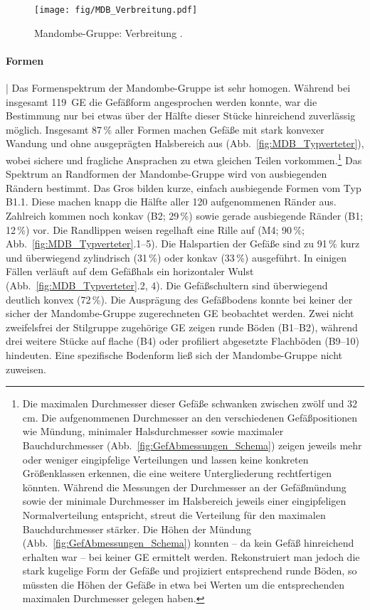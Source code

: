 \begin{figure}[p]
	\centering
	\texttt{[image: fig/MDB\_Verbreitung.pdf]}
	\caption{Mandombe-Gruppe: Verbreitung \parencite[P1 nach][114 Abb.~42]{Gillet.2013}.}
	\label{fig:MDB_Verbreitung}
\end{figure}

\paragraph{Formen}\hspace{-.5em}|\hspace{.5em}%
Das Formenspektrum der Mandombe-Gruppe ist sehr homogen. Während bei insgesamt 119~GE die Gefäßform angesprochen werden konnte, war die Bestimmung nur bei etwas über der Hälfte dieser Stücke hinreichend zuverlässig möglich. Insgesamt 87\,\% aller Formen machen Gefäße mit stark konvexer Wandung und ohne ausgeprägten Halsbereich aus (Abb.~\ref{fig:MDB_Typverteter}), wobei sichere und fragliche Ansprachen zu etwa gleichen Teilen vorkommen.\footnote{Die maximalen Durchmesser dieser Gefäße schwanken zwischen zwölf und 32\,cm. Die aufgenommenen Durchmesser an den verschiedenen Gefäßpositionen wie Mündung, minimaler Halsdurchmesser sowie maximaler Bauchdurchmesser (Abb.~\ref{fig:GefAbmessungen_Schema}) zeigen jeweils mehr oder weniger eingipfelige Verteilungen und lassen keine konkreten Größenklassen erkennen, die eine weitere Untergliederung rechtfertigen könnten. Während die Messungen der Durchmesser an der Gefäßmündung sowie der minimale Durchmesser im Halsbereich jeweils einer eingipfeligen Normalverteilung entspricht, streut die Verteilung für den maximalen Bauchdurchmesser stärker. Die Höhen der Mündung (Abb.~\ref{fig:GefAbmessungen_Schema}) konnten -- da kein Gefäß hinreichend erhalten war -- bei keiner GE ermittelt werden. Rekonstruiert man jedoch die stark kugelige Form der Gefäße und projiziert entsprechend runde Böden, so müssten die Höhen der Gefäße in etwa bei Werten um die entsprechenden maximalen Durchmesser gelegen haben.} Das Spektrum an Randformen der Mandombe-Gruppe wird von ausbiegenden Rändern bestimmt. Das Gros bilden kurze, einfach ausbiegende Formen vom Typ B1.1. Diese machen knapp die Hälfte aller 120 aufgenommenen Ränder aus. Zahlreich kommen noch konkav (B2; 29\,\%) sowie gerade ausbiegende Ränder (B1; 12\,\%) vor. Die Randlippen weisen regelhaft eine Rille auf (M4; 90\,\%; Abb.~\ref{fig:MDB_Typverteter}.1--5). Die Halspartien der Gefäße sind zu 91\,\% kurz und überwiegend zylindrisch (31\,\%) oder konkav (33\,\%) ausgeführt. In einigen Fällen verläuft auf dem Gefäßhals ein horizontaler Wulst (Abb.~\ref{fig:MDB_Typverteter}.2, 4). Die Gefäßschultern sind überwiegend deutlich konvex (72\,\%). Die Ausprägung des Gefäßbodens konnte bei keiner der sicher der Mandombe-Gruppe zugerechneten GE beobachtet werden. Zwei nicht zweifelsfrei der Stilgruppe zugehörige GE zeigen runde Böden (B1--B2), während drei weitere Stücke auf flache (B4) oder profiliert abgesetzte Flachböden (B9--10) hindeuten. Eine spezifische Bodenform ließ sich der Mandombe-Gruppe nicht zuweisen.


